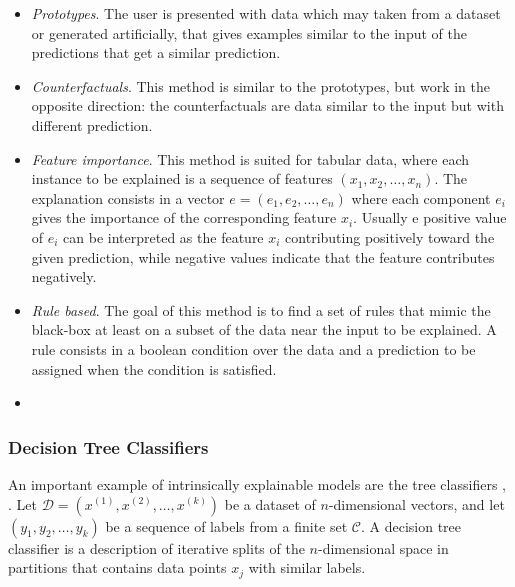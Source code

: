 \documentclass[]{marticle}
\newcommand{\ds}{\mathcal{D}}
\newcommand{\codes}{\mathcal{C}}
\begin{document}
\begin{itemize}

\item \textit{Prototypes}. The user is presented with data which may taken from a dataset or
    generated artificially, that gives examples similar to the input of the predictions that get a
    similar prediction.

\item \textit{Counterfactuals}. This method is similar to the prototypes, but work in the opposite
    direction: the counterfactuals are data similar to the input but with different prediction.

\item \textit{Feature importance}. This method is suited for tabular data, where each instance to be
    explained is a sequence of features $(x_1, x_2, \dots, x_n)$. The explanation consists in a
    vector $e=(e_1, e_2, \dots, e_n)$ where each component $e_i$ gives the importance of the
    corresponding feature $x_i$. Usually e positive value of $e_i$ can be interpreted as the feature
    $x_i$ contributing positively toward the given prediction, while negative values indicate that
    the feature contributes negatively.

\item \textit{Rule based}. The goal of this method is to find a set of rules that mimic the
    black-box at least on a subset of the data near the input to be explained. A rule consists in a
    boolean condition over the data and a prediction to be assigned when the condition is satisfied.

\item {}
\end{itemize}

\subsubsection{Decision Tree Classifiers}

An important example of intrinsically explainable models are the tree classifiers
\cite{tibsharani-elements}, \cite{trees-breiman}. Let $\ds=(x^{(1)}, x^{(2)}, \dots, x^{(k)})$ be a
dataset of $n$-dimensional vectors, and let $(y_1, y_2, \dots, y_k)$ be a sequence of labels from a
finite set $\codes$. A decision tree classifier is a description of iterative splits of the
$n$-dimensional space in partitions that contains data points $x_j$ with similar labels.
\end{document}
